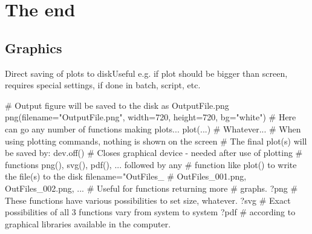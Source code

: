 \documentclass[compress, ucs, xelatex, 11pt, xcolor=svgnames,
  hyperref={
    bookmarks=true,
    unicode=true,
    colorlinks=true,
    pdftitle={Molecular data in R},
    plainpages=false,
    pdfauthor={Vojtech Zeisek},
    pdfsubject={Course about phylogeny and evolution in R},
    pdfcreator={XeLaTeX},
    pdfkeywords={R, evolution, phylogeny, molecular data},
    linkcolor=Tomato,
    anchorcolor=SaddleBrown,
    citecolor=Goldenrod,
    filecolor=DarkMagenta,
    menucolor=Sienna,
    urlcolor=DarkTurquoise,
    pdftex},
  url={hyphens, lowtilde} %
  ]{beamer}
\begin{document}
%

\section{The end}

\subsection{Graphics}

\begin{frame}[fragile]{Direct saving of plots to disk}{Useful e.g. if plot should be bigger than screen, requires special settings, if done in batch, script, etc.}
  \begin{spluscode}
    # Output figure will be saved to the disk as OutputFile.png
    png(filename="OutputFile.png", width=720, height=720, bg="white")
    # Here can go any number of functions making plots...
    plot(...) # Whatever...
    # When using plotting commands, nothing is shown on the screen
    # The final plot(s) will be saved by:
    dev.off() # Closes graphical device - needed after use of plotting
              # functions png(), svg(), pdf(), ... followed by any
              # function like plot() to write the file(s) to the disk
    filename="OutFiles_%
                                 # OutFiles_001.png, OutFiles_002.png, ...
                                 # Useful for functions returning more
                                 # graphs.
    ?png # These functions have various possibilities to set size, whatever.
    ?svg # Exact possibilities of all 3 functions vary from system to system
    ?pdf # according to graphical libraries available in the computer.
  \end{spluscode}
\end{frame}
\end{document}
